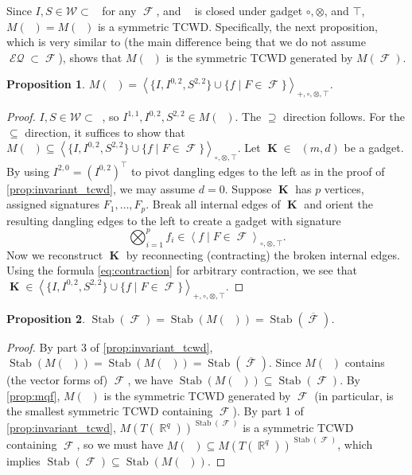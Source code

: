 \documentclass{article}
\newtheorem{proposition}{Proposition}[section]
\theoremstyle{remark}
\theoremstyle{definition}
\DeclareMathOperator{\rr}{\mathbb{R}}
\DeclareMathOperator{\vk}{\mathbf{K}}
\DeclareMathOperator{\fc}{\mathcal{F}}
\DeclareMathOperator{\gk}{\mathfrak{G}_{\mathcal{F}}}
\DeclareMathOperator{\qk}{\mathfrak{Q}_{\mathcal{F}}}
\DeclareMathOperator{\ofc}{\overline{\fc}}
\DeclareMathOperator{\stab}{Stab}
\newcommand{\tcwd}[1]{\left\langle #1 \right\rangle_{+, \circ, \otimes ,\top}}
\newcommand{\tcwdn}[1]{\left\langle #1 \right\rangle_{\circ, \otimes ,\top}}
\DeclareMathOperator{\eq}{\mathcal{EQ}}
\begin{document}
Since $I,S \in \mathcal{W} \subset \ofc$ for any $\fc$, and $\gk$ is closed under gadget 
$\circ,\otimes$, and $\top$, $M(\qk) = M(\ofc)$ is a symmetric TCWD. Specifically,
the next proposition, which is very similar to \cite[Theorem 3]{young2022equality} (the main difference 
being that we do not assume $\eq \subset \fc$), shows that $M(\qk)$ is the symmetric TCWD generated by $M(\fc)$.
\begin{proposition}
    $M(\qk) = \tcwd{\big\{I,I^{0,2},S^{2,2}\big\} \cup \big\{f \mid F \in \fc\big\}}$.
    \label{prop:mqf}
\end{proposition}
\begin{proof}
    $I, S\in \mathcal{W} \subset \ofc$, so $I^{1,1},I^{0,2},S^{2,2} \in M(\qk)$.
    The $\supseteq$ direction follows. For the $\subseteq$ direction, it suffices to show
    that $M(\gk) \subseteq \tcwdn{\big\{I,I^{0,2},S^{2,2}\big\} \cup \big\{f \mid F \in \fc\big\}}$.
    Let $\vk \in \gk(m,d)$ be a gadget. By using $I^{2,0} = (I^{0,2})^\top$ to pivot dangling edges to the
    left as in the proof of \autoref{prop:invariant_tcwd}, we may assume $d = 0$.
    Suppose $\vk$ has $p$ vertices, assigned signatures $F_1,\ldots,F_{p}$.
    Break all internal edges of $\vk$ and orient the resulting dangling edges to the left 
    to create a gadget with signature
    \begin{equation}
        \bigotimes_{i=1}^{p} f_i \in \tcwdn{f \mid F \in \fc}.
        \label{eq:biggadget}
    \end{equation}
    Now we reconstruct $\vk$ by reconnecting (contracting) the broken internal edges. 
    Using the formula \eqref{eq:contraction} for arbitrary contraction, we see that
    $\vk \in \tcwd{\big\{I,I^{0,2},S^{2,2}\big\} \cup \big\{f \mid F \in \fc\big\}}$.
\end{proof}

\begin{proposition}
    \label{prop:stabfc}
    $\stab(\fc) = \stab(M(\qk)) = \stab(\overline{\fc})$.
\end{proposition}
\begin{proof}
    By part 3 of \autoref{prop:invariant_tcwd}, $\stab(M(\qk)) = \stab(M(\ofc)) = \stab(\overline{\fc})$.
    Since $M(\qk)$ contains (the vector forms of) $\fc$, we have
    $\stab(M(\qk)) \subseteq \stab(\fc)$. By \autoref{prop:mqf}, 
    $M(\qk)$ is the symmetric TCWD generated by $\fc$ (in particular, is the smallest symmetric
    TCWD containing $\fc$).
    By part 1 of \autoref{prop:invariant_tcwd}, $M(T(\rr^q))^{\stab(\fc)}$ is a symmetric TCWD
    containing $\fc$, so we must have $M(\qk) \subseteq M(T(\rr^q))^{\stab(\fc)}$, which implies
    $\stab(\fc) \subseteq \stab(M(\qk))$.
\end{proof}
\end{document}

